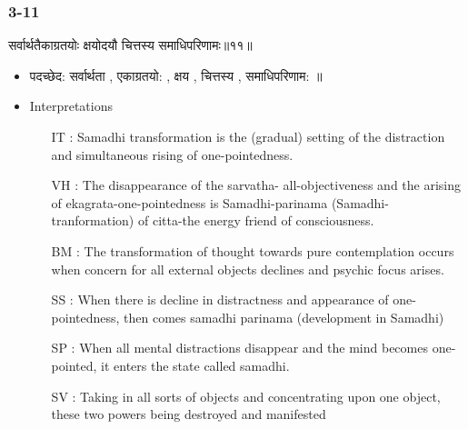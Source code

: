 \begin{frame}[fragile]\frametitle{3-11}
\begin{sanskrit}
सर्वार्थतैकाग्रतयोः क्षयोदयौ चित्तस्य समाधिपरिणामः॥११॥
\end{sanskrit}

	\begin{itemize}
	\item पदच्छेद:  सर्वार्थता , एकाग्रतयो: , क्षय‌ , चित्तस्य , समाधिपरिणाम: ॥
	\item Interpretations
		\begin{itemize}	
		\item [IT]: Samadhi transformation is the (gradual) setting of the distraction and simultaneous rising of one-pointedness.
		\item [VH]: The disappearance of the sarvatha- all-objectiveness and the arising of ekagrata-one-pointedness is Samadhi-parinama (Samadhi-tranformation) of citta-the energy friend of consciousness.
		\item [BM]: The transformation of thought towards pure contemplation occurs when concern for all external objects declines and psychic focus arises.
		\item [SS]: When there is decline in distractness and appearance of one-pointedness, then comes samadhi parinama (development in Samadhi)
		\item [SP]: When all mental distractions disappear and the mind becomes one-pointed, it enters the state called samadhi.
		\item [SV]: Taking in all sorts of objects and concentrating upon one object, these two powers being destroyed and manifested 
		\end{itemize}
	\end{itemize}
\end{frame}

